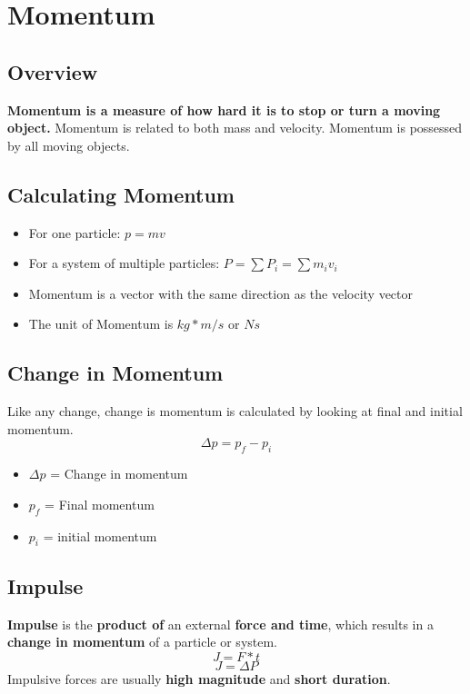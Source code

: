 \section{Momentum}

\subsection{Overview}
\textbf{Momentum is a measure of how hard it is to stop or turn a moving object.} Momentum is related to both mass and velocity. Momentum is possessed by all moving objects.

\subsection{Calculating Momentum}
\begin{itemize}
	\item For one particle: $p=mv$ 
	\item For a system of multiple particles: $P=\sum P_i=\sum m_iv_i$\
	\item Momentum is a vector with the same direction as the velocity vector
	\item The unit of Momentum is $kg*m/s$ or $Ns$
\end{itemize}

\subsection{Change in Momentum}
Like any change, change is momentum is calculated by looking at final and initial momentum. \[\Delta p = p_f-p_i\]
\begin{itemize}
	\item $\Delta p$ = Change in momentum
	\item $p_f$ = Final momentum
	\item $p_i$ = initial momentum
\end{itemize}

\subsection{Impulse}
\textbf{Impulse} is the \textbf{product of} an external \textbf{force and time}, which results in a \textbf{change in momentum} of a particle or system. \[J=F*t\] \[J=\Delta P\] Impulsive forces are usually \textbf{high magnitude} and \textbf{short duration}. 

